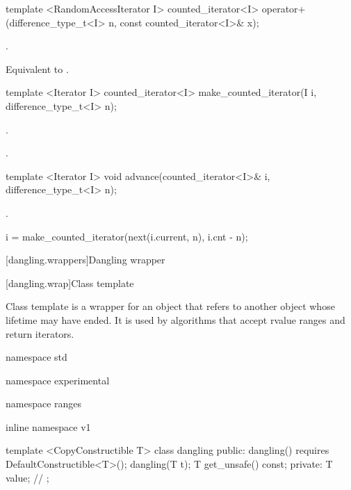 \begin{addedblock}
%
%
\begin{itemdecl}
template <RandomAccessIterator I>
  counted_iterator<I>
    operator+(difference_type_t<I> n, const counted_iterator<I>& x);
\end{itemdecl}

\begin{itemdescr}
\pnum
\requires {}.

\pnum
\effects Equivalent to
.
\end{itemdescr}

%
\begin{itemdecl}
template <Iterator I>
  counted_iterator<I> make_counted_iterator(I i, difference_type_t<I> n);
\end{itemdecl}

\begin{itemdescr}
\pnum
\requires {}.

\pnum
\returns {}.
\end{itemdescr}

%
\begin{itemdecl}
template <Iterator I>
  void advance(counted_iterator<I>& i, difference_type_t<I> n);
\end{itemdecl}

\begin{itemdescr}
\pnum
\requires {}.

\pnum
\effects
\begin{codeblock}
i = make_counted_iterator(next(i.current, n), i.cnt - n);
\end{codeblock}
\end{itemdescr}

[dangling.wrappers]{Dangling wrapper}

[dangling.wrap]{Class template }

\pnum
{}%
Class template  is a wrapper for an object that refers to another object whose
lifetime may have ended. It is used by algorithms that accept rvalue ranges and return iterators.

\begin{codeblock}
namespace std { namespace experimental { namespace ranges { inline namespace v1 {
  template <CopyConstructible T>
  class dangling {
  public:
    dangling() requires DefaultConstructible<T>();
    dangling(T t);
    T get_unsafe() const;
  private:
    T value; // \expos
  };

}}}}
\end{codeblock}
\end{addedblock}
